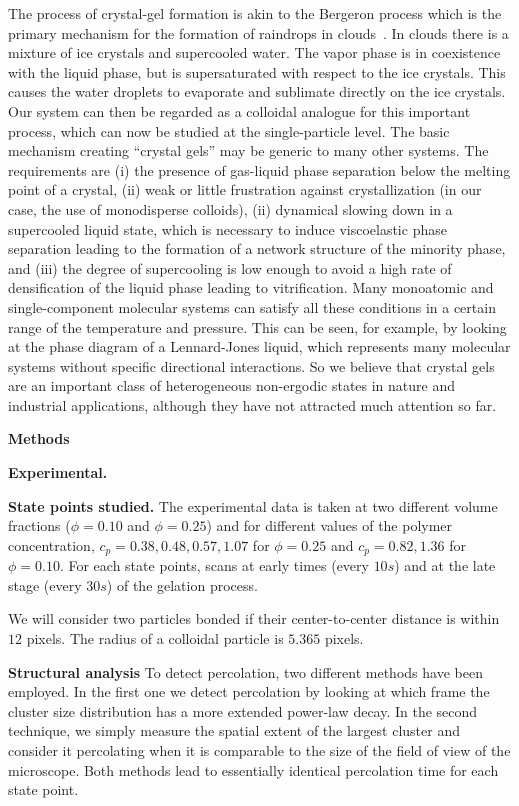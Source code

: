 \documentclass[a4paper,preprint,superscriptaddress]{revtex4}
\begin{document}
The process of crystal-gel formation is akin to the Bergeron process which is the primary mechanism for the formation of raindrops in clouds~\cite{glickman2000glossary}.
In clouds there is a mixture of ice crystals and supercooled water. The vapor phase is in coexistence with the liquid phase, but is supersaturated
with respect to the ice crystals. This causes the water droplets to evaporate and sublimate directly on the ice crystals. Our system can then
be regarded as a colloidal analogue for this important process, which can now be studied at the single-particle level.
The basic mechanism creating ``crystal gels'' may be generic to many other
systems. The requirements are (i) the presence of gas-liquid phase separation below the melting point of a crystal, (ii) 
weak or little frustration against crystallization (in our case, the use of monodisperse colloids), 
(ii) dynamical slowing down in a supercooled liquid state, which is necessary to induce viscoelastic phase separation leading to the formation 
of a network structure of the minority phase, and (iii) the degree of supercooling is low enough to avoid a high rate of densification of the liquid phase 
leading to vitrification.   
Many monoatomic and single-component molecular systems can satisfy all these conditions in a certain range of the temperature and pressure. 
This can be seen, for example, by looking at the phase diagram of a Lennard-Jones liquid, which represents many molecular systems 
without specific directional interactions. So we believe that crystal gels are an important class of heterogeneous non-ergodic states in nature 
and industrial applications, although they have not attracted much attention so far.  

\vspace{2cm}
\noindent
{\bf \large Methods}

\noindent
{\bf Experimental.}

\noindent
{\bf State points studied. }
The experimental data is taken at two different volume fractions ($\phi=0.10$ and $\phi=0.25$) and for different values
of the polymer concentration, $c_p=0.38,0.48,0.57,1.07$ for $\phi=0.25$ and $c_p=0.82,1.36$ for $\phi=0.10$.
For each state points, scans at early times (every $10s$) and at the late stage (every $30s$) of the gelation process.

We will consider two particles bonded if their center-to-center distance is within $12$ pixels. The radius of a colloidal
particle is $5.365$ pixels.

\noindent
{\bf Structural analysis}
To detect percolation, two different methods have been employed. In the first one we detect percolation
by looking at which frame the cluster size distribution has a more extended power-law decay. In the second technique,
we simply measure the spatial extent of the largest cluster and consider it percolating when it is comparable to the
size of the field of view of the microscope. Both methods lead to essentially identical percolation time for each state point.
\end{document}

